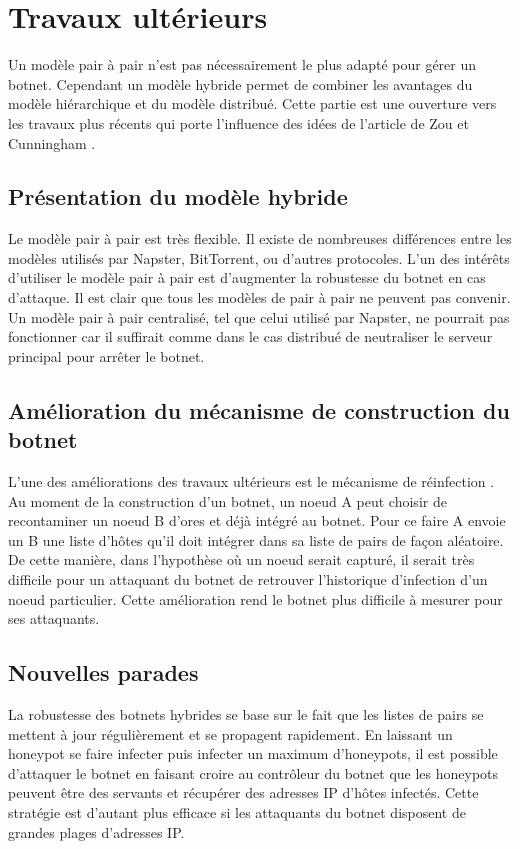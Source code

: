 \section{Travaux ultérieurs}

Un modèle pair à pair n'est pas nécessairement le plus adapté pour
gérer un botnet. Cependant un modèle hybride permet de combiner les
avantages du modèle hiérarchique et du modèle distribué. Cette partie
est une ouverture vers les travaux plus récents qui porte l'influence
des idées de l'article de Zou et Cunningham \cite{main}.

\subsection{Présentation du modèle hybride}

Le modèle pair à pair est très flexible. Il existe de nombreuses différences
entre les modèles utilisés par Napster, BitTorrent, ou d'autres protocoles.
L'un des intérêts d'utiliser le modèle pair à pair est d'augmenter la robustesse
du botnet en cas d'attaque. Il est clair que tous les modèles de pair à pair ne
peuvent pas convenir. Un modèle pair à pair centralisé, tel que celui utilisé
par Napster, ne pourrait pas fonctionner car il suffirait comme dans le cas
distribué de neutraliser le serveur principal pour arrêter le botnet.

\subsection{Amélioration du mécanisme de construction du botnet}

L'une des améliorations des travaux ultérieurs est le mécanisme de réinfection
\cite{p2p}.  Au moment de la construction d'un botnet, un noeud A peut choisir
de recontaminer un noeud B d'ores et déjà intégré au botnet. Pour ce faire A
envoie un B une liste d'hôtes qu'il doit intégrer dans sa liste de pairs de
façon aléatoire. De cette manière, dans l'hypothèse où un noeud serait capturé,
il serait très difficile pour un attaquant du botnet de retrouver l'historique
d'infection d'un noeud particulier. Cette amélioration rend le botnet plus
difficile à mesurer pour ses attaquants.

\subsection{Nouvelles parades}

La robustesse des botnets hybrides se base sur le fait que les listes de pairs se
mettent à jour régulièrement et se propagent rapidement. En laissant un honeypot
se faire infecter puis infecter un maximum d'honeypots, il est possible
d'attaquer le botnet en faisant croire au contrôleur du botnet que les
honeypots peuvent être des servants et récupérer des adresses IP d'hôtes
infectés. Cette stratégie est d'autant plus efficace si les attaquants du botnet
disposent de grandes plages d'adresses IP.


